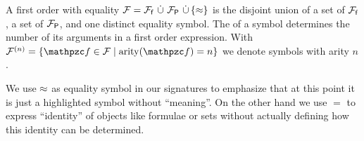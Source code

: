 
\begin{definition}\label{def:signature}
A
first order
 with equality
\( \mathcal{F} = {\mathcal{F}_{\mathsf{f}}} \, \mathop{\dot\cup} \, {\mathcal{F}_{\mathsf{P}}} \, \mathop{\dot\cup} \, \{\approx \} \)
is the disjoint union of
a set of  \( {\mathcal{F}_{\mathsf{f}}} \),
a set of  \( {\mathcal{F}_{\mathsf{P}}} \),
and one distinct equality symbol.
%
The  of a symbol determines the number of its arguments in a first order expression.
With \( \mcFn = \{ \mcf\in\mcF \mid \arity(\mcf) = n \} \) we denote symbols with arity \( n \).
\end{definition}

\begin{remark}
    We use \( \approx \) as equality symbol in our signatures to emphasize
    that at this point it is just a highlighted symbol
    without “meaning”.
    On the other hand we use \( = \) to express “identity” of objects
    like formulae or sets
    without actually defining how this identity can be determined.
\end{remark}
